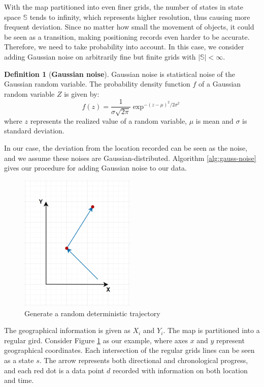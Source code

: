 \documentclass[12pt]{article}
\theoremstyle{definition}
\newtheorem{definition}{Definition}[section]
\begin{document}
With the map partitioned into even finer grids, the number of states in state space \(\mathbb{S}\) tends to infinity, which represents higher resolution, thus causing more frequent deviation. Since no matter how small the movement of objects, it could be seen as a transition, making positioning records even harder to be accurate. Therefore, we need to take probability into account. In this case, we consider adding Gaussian noise on arbitrarily fine but finite grids with \(\left|\mathbb{S}\right|<\infty.\)

\begin{definition}[\textbf{Gaussian noise}]
  \label{def:gaussian_noise}
  Gaussian noise is statistical noise of the Gaussian random variable. The probability density function \(f\) of a Gaussian random variable \(Z\) is given by:
  \begin{equation*}
  f(z)= \frac{1}{\sigma\sqrt{2\pi}} \exp^{-(z-\mu)^2/2\sigma^2}
  \end{equation*}
  where \(z\) represents the realized value of a random variable, \(\mu\) is mean and \(\sigma\) is standard deviation.
\end{definition}


In our case, the deviation from the location recorded can be seen as the noise, and we assume these noises are Gaussian-distributed. Algorithm \ref{alg:gauss-noise} gives our procedure for adding Gaussian noise to our data.

\begin{figure}
  \centering
  \includegraphics[width=5.5cm]{gaussian_noise_1}
  \captionsetup{justification=centering}
  \caption{Generate a random deterministic trajectory}
  \label{fig:gaussian_noise_1}
\end{figure}

The geographical information is given as \(X_{i}\) and \(Y_{i}\). The map is partitioned into a regular gird. Consider Figure \ref{fig:gaussian_noise_1} as our example, where axes \(x\) and \(y\) represent geographical coordinates. Each intersection of the regular grids lines can be seen as a state \(s\). The arrow represents both directional and chronological progress, and each red dot is a data point \(d\) recorded with information on both location and time. 
\end{document}
